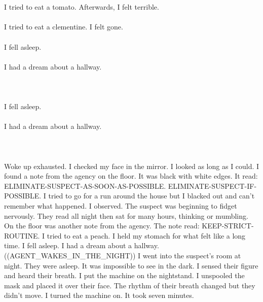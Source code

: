 \documentclass{article}
\begin{document}
    \section{}
    I tried to eat a tomato. Afterwards, I felt terrible.\\\\I tried to eat a clementine. I felt gone.\\\\I fell asleep.\\\\I had a dream about a hallway.\\\\ 
    \newpage
    
    \section{}
    I fell asleep.\\\\I had a dream about a hallway.\\\\ 
    \newpage
    
    \section{}
    Woke up exhausted. I checked my face in the mirror. I looked as long as I could. I found a note from the agency on the floor. It was black with white edges. It read: ELIMINATE-SUSPECT-AS-SOON-AS-POSSIBLE. ELIMINATE-SUSPECT-IF-POSSIBLE. I tried to go for a run around the house but I blacked out and can't remember what happened. I observed. The suspect was beginning to fidget nervously. They read all night then sat for many hours, thinking or mumbling. On the floor was another note from the agency. The note read: KEEP-STRICT-ROUTINE. I tried to eat a peach. I held my stomach for what felt like a long time. I fell asleep. I had a dream about a hallway. ((AGENT_WAKES_IN_THE_NIGHT)) I went into the suspect's room at night. They were asleep. It was impossible to see in the dark. I sensed their figure and heard their breath. I put the machine on the nightstand. I unspooled the mask and placed it over their face. The rhythm of their breath changed but they didn't move. I turned the machine on. It took seven minutes. \\\\
    \newpage
    
\end{document}
